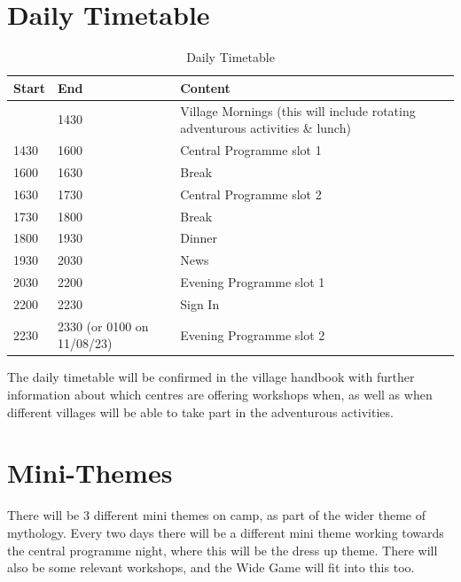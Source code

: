 \documentclass[a4paper, 11pt]{report}
\begin{document}
\section{Daily Timetable}
\begin{table}[H]
    \label{tab:daily-timetable}
    \centering
    \begin{tabular}{p{} p{} p{}}
        \textbf{Start} & \textbf{End} & \textbf{Content}\\
        \hline
         & 1430 & Village Mornings (this will include rotating adventurous activities \& lunch) \\
        \hline
        1430 & 1600 & Central Programme slot 1 \\
        \hline
        1600 & 1630 & Break \\
        \hline
        1630 & 1730 & Central Programme slot 2 \\
        \hline
        1730 & 1800 & Break \\
        \hline
        1800 & 1930 & Dinner \\
        \hline
        1930 & 2030 & News \\
        \hline
        2030 & 2200 & Evening Programme slot 1 \\
        \hline
        2200 & 2230 & Sign In \\
        \hline
        2230 & 2330 (or 0100 on 11/08/23) & Evening Programme slot 2 \\
        \hline
    \end{tabular}
    \caption{Daily Timetable}
\end{table}
The daily timetable will be confirmed in the village handbook with further information about which centres are offering workshops when, as well as when different villages will be able to take part in the adventurous activities. 

\section{Mini-Themes}
There will be 3 different mini themes on camp, as part of the wider theme of mythology. Every two days there will be a different mini theme working towards the central programme night, where this will be the dress up theme. There will also be some relevant workshops, and the Wide Game will fit into this too.
\end{document}
